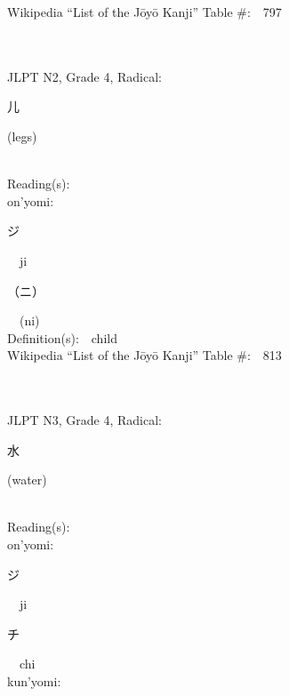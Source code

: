 \begin{multicols}{2}
Wikipedia ``List of the J\=oy\=o Kanji'' Table \#:\ \ 797 \\
\ \ \\
{\fontsize{34pt}{40pt}  }\ \ \\  %
{JLPT N2, Grade 4, Radical:\ \ {\begin{CJK}{UTF8}{min} 儿 \end{CJK}} (legs) } \\
Reading(s):\ \ \\
{\hspace*{1em}}on'yomi:\ \ \\
{\hspace*{2em}}{\begin{CJK}{UTF8}{min} ジ \end{CJK}}\ \ ji\ \ \\
{\hspace*{2em}}{\begin{CJK}{UTF8}{min} （ニ） \end{CJK}}\ \ (ni)\ \ \\
Definition(s):\ \ child \\
Wikipedia ``List of the J\=oy\=o Kanji'' Table \#:\ \ 813 \\
\ \ \\
{\fontsize{34pt}{40pt}  }\ \ \\  %
{JLPT N3, Grade 4, Radical:\ \ {\begin{CJK}{UTF8}{min} 水 \end{CJK}} (water) } \\
Reading(s):\ \ \\
{\hspace*{1em}}on'yomi:\ \ \\
{\hspace*{2em}}{\begin{CJK}{UTF8}{min} ジ \end{CJK}}\ \ ji\ \ \\
{\hspace*{2em}}{\begin{CJK}{UTF8}{min} チ \end{CJK}}\ \ chi\ \ \\
{\hspace*{1em}}kun'yomi:\ \ \\

\end{multicols}
